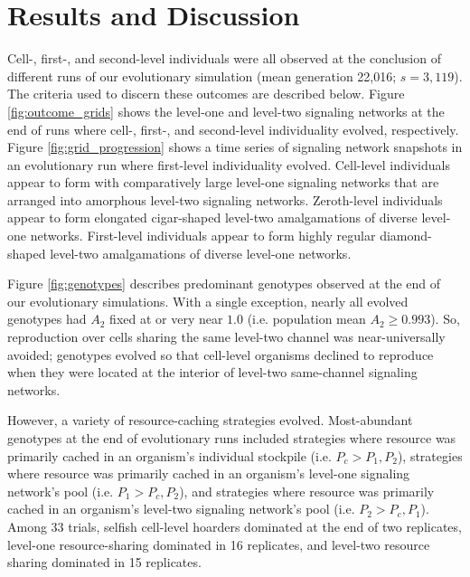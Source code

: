 \section{Results and Discussion}













Cell-, first-, and second-level individuals were all observed at the conclusion of different runs of our evolutionary simulation (mean generation 22,016; $s=3,119$).
The criteria used to discern these outcomes are described below.
Figure \ref{fig:outcome_grids} shows the level-one and level-two signaling networks at the end of runs where cell-, first-, and second-level individuality evolved, respectively.
Figure \ref{fig:grid_progression} shows a time series of signaling network snapshots in an evolutionary run where first-level individuality evolved.
Cell-level individuals appear to form with comparatively large level-one signaling networks that are arranged into amorphous level-two signaling networks.
Zeroth-level individuals appear to form elongated cigar-shaped level-two amalgamations of diverse level-one networks.
First-level individuals appear to form highly regular diamond-shaped level-two amalgamations of diverse level-one networks.

Figure \ref{fig:genotypes} describes predominant genotypes observed at the end of our evolutionary simulations.
With a single exception, nearly all evolved genotypes had $A_2$ fixed at or very near $1.0$ (i.e. population mean $A_2 \geq 0.993$).
So, reproduction over cells sharing the same level-two channel was near-universally avoided;
genotypes evolved so that cell-level organisms declined to reproduce when they were located at the interior of level-two same-channel signaling networks.

However, a variety of resource-caching strategies evolved.
Most-abundant genotypes at the end of evolutionary runs included strategies where resource was primarily cached in an organism's individual stockpile (i.e. $P_{c} > P_1, P_2$), strategies where resource was primarily cached in an organism's level-one signaling network's pool (i.e. $P_1 > P_{c}, P_2$), and strategies where resource was primarily cached in an organism's level-two signaling network's pool (i.e. $P_2 > P_{c}, P_1$).
Among 33 trials, selfish cell-level hoarders dominated at the end of two replicates, level-one resource-sharing dominated in 16 replicates, and level-two resource sharing dominated in 15 replicates.

